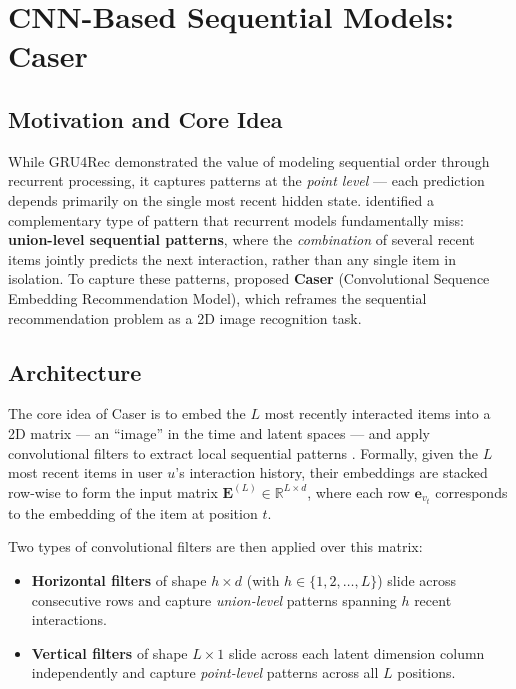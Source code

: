 \documentclass[12pt,a4paper]{report}
\newcommand{\textcite}[1]{\citet{#1}}
\newcommand{\parencite}[1]{\citep{#1}}
\begin{document}
\section{CNN-Based Sequential Models: Caser}

\subsection{Motivation and Core Idea}

While GRU4Rec demonstrated the value of modeling sequential order
through recurrent processing, it captures patterns at the
\textit{point level} --- each prediction depends primarily on the
single most recent hidden state. \textcite{tang2018caser} identified
a complementary type of pattern that recurrent models fundamentally
miss: \textbf{union-level sequential patterns}, where the
\textit{combination} of several recent items jointly predicts the
next interaction, rather than any single item in isolation. To
capture these patterns, \textcite{tang2018caser} proposed
\textbf{Caser} (Convolutional Sequence Embedding Recommendation
Model), which reframes the sequential recommendation problem as a
2D image recognition task.

\subsection{Architecture}

The core idea of Caser is to embed the $L$ most recently interacted
items into a 2D matrix --- an ``image'' in the time and latent
spaces --- and apply convolutional filters to extract local sequential
patterns \parencite{tang2018caser}. Formally, given the $L$ most
recent items in user $u$'s interaction history, their embeddings are
stacked row-wise to form the input matrix
$\mathbf{E}^{(L)} \in \mathbb{R}^{L \times d}$,
where each row $\mathbf{e}_{v_t}$ corresponds to the embedding of
the item at position $t$.

Two types of convolutional filters are then applied over this matrix:
\begin{itemize}
  \item \textbf{Horizontal filters} of shape $h \times d$ (with
        $h \in \{1, 2, \ldots, L\}$) slide across consecutive rows
        and capture \textit{union-level} patterns spanning $h$ recent
        interactions.
  \item \textbf{Vertical filters} of shape $L \times 1$ slide across
        each latent dimension column independently and capture
        \textit{point-level} patterns across all $L$ positions.
\end{itemize}
\end{document}
